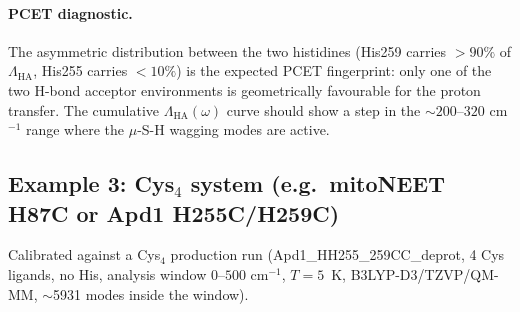 \documentclass[10pt,a4paper,twoside]{article}
\begin{document}
\paragraph{PCET diagnostic.}
The asymmetric distribution between the two histidines
(His259 carries $> 90\%$ of $\Lambda_\text{HA}$, His255 carries
$< 10\%$) is the expected PCET fingerprint: only one of the two
H-bond acceptor environments is geometrically favourable for the
proton transfer. The cumulative $\Lambda_\text{HA}(\omega)$ curve
should show a step in the $\sim 200\text{--}320$ cm$^{-1}$ range
where the $\mu$-S-H wagging modes are active.

\subsection{Example 3: Cys$_4$ system (e.g.\ mitoNEET H87C or Apd1 H255C/H259C)}

Calibrated against a Cys$_4$ production run (Apd1\_HH255\_259CC\_deprot,
4 Cys ligands, no His, analysis window $0\text{--}500$ cm$^{-1}$,
$T = 5$~K, B3LYP-D3/TZVP/QM-MM, $\sim$5931 modes inside the window).
\end{document}
